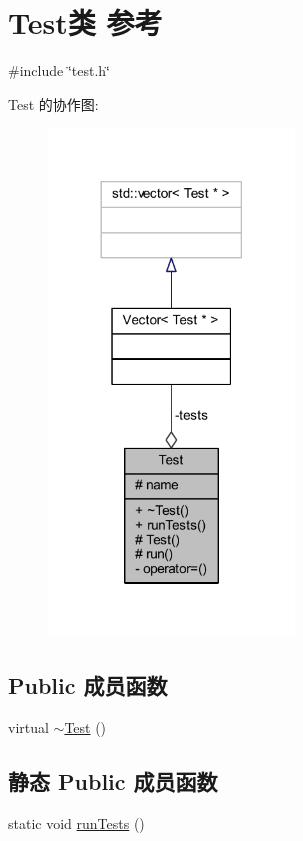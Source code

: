 \hypertarget{classTest}{}\section{Test类 参考}
\label{classTest}


{\ttfamily \#include \char`\"{}test.\+h\char`\"{}}



Test 的协作图\+:
\nopagebreak
\begin{figure}[H]
\begin{center}
\leavevmode
\includegraphics[width=185pt]{classTest__coll__graph}
\end{center}
\end{figure}
\subsection*{Public 成员函数}
\begin{DoxyCompactItemize}
\item 
virtual \hyperlink{classTest_ac9dcc51f46141d9ed1e8206ca0011b8c}{$\sim$\+Test} ()
\end{DoxyCompactItemize}
\subsection*{静态 Public 成员函数}
\begin{DoxyCompactItemize}
\item 
static void \hyperlink{classTest_a50697b06fcd7021c126a5bceceb6757c}{run\+Tests} ()
\end{DoxyCompactItemize}
